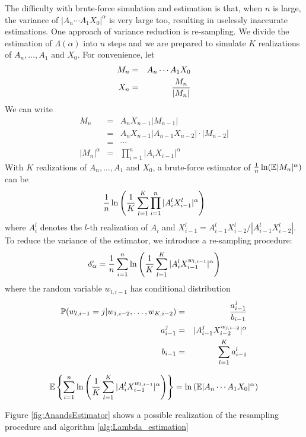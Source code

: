 \documentclass[aoas,preprint]{imsart}
\numberwithin{equation}{section}
\theoremstyle{plain}
\begin{document}
The difficulty with brute-force simulation and estimation is that,
when $n$ is large, the variance of $|A_n \cdots A_1 X_0|^\alpha$
is very large too, resulting in uselessly inaccurate estimations. One
approach of variance reduction is re-sampling. We divide the
estimation of $\Lambda(\alpha)$ into $n$ steps and we are prepared to
simulate $K$ realizations of $A_n, \dots, A_1$ and $X_0$. For
convenience, let
\begin{eqnarray*}
  M_n &=& A_n \cdots A_1 X_0 \\
  X_n &=& {M_n \over |M_n|}
\end{eqnarray*}
We can write
\begin{eqnarray*}
  M_n &=& A_n X_{n - 1} |M_{n - 1}| \\
  &=& A_n X_{n - 1} |A_{n-1} X_{n-2}| \cdot |M_{n-2}| \\
  &=& \cdots \\
  |M_n|^\alpha &=& \prod_{i=1}^n |A_i X_{i-1}|^\alpha
\end{eqnarray*}
With $K$ realizations of $A_n, \dots, A_1$ and $X_0$, a brute-force
estimator of ${1 \over n} \ln(\E |M_n|^\alpha)$ can be
\[
{1 \over n} \ln \left(
  {1 \over K} \sum_{l=1}^K \prod_{i=1}^n |A_i^l X^l_{i-1}|^\alpha
\right)
\]
where $A_i^l$ denotes the $l$-th realization of $A_i$ and
$X^l_{i-1} = A_{i-1}^l X^l_{i-2}/|A_{i-1}^l X^l_{i-2}|$. To reduce the
variance of the estimator, we introduce a re-sampling procedure:
\begin{equation}
  \label{eq:AnandsEstimator}
  \mathscr E_\alpha =
  {1 \over n}
  \sum_{i=1}^n \ln \left(
    {1 \over K}\sum_{l=1}^K |A_i^l X^{w_{l, i-1}}_{i-1}|^\alpha
  \right)
\end{equation}
where the random variable $w_{l, i-1}$ has conditional distribution
\begin{eqnarray*}
  \P(w_{l, i-1} = j | w_{1, i-2}, \dots, w_{K, i-2}) &=& {a^j_{i-1} \over b_{i-1}} \\
  a_{i-1}^j &=& |A_{i-1}^j X_{i-2}^{w_{j, i-2}}|^\alpha \\
  b_{i-1} &=& \sum_{l=1}^K a_{i-1}^l
\end{eqnarray*}
\begin{theorem}
  \[
  \E \left\{
    \sum_{i=1}^n \ln \left(
      {1 \over K}\sum_{l=1}^K |A_i^l X^{w_{l, i-1}}_{i-1}|^\alpha
    \right)
  \right\} = \ln \left(
    \E |A_n \cdots A_1 X_0|^\alpha
  \right)
  \]
\end{theorem}
Figure \ref{fig:AnandsEstimator} shows a possible realization of the
resampling procedure and algorithm \ref{alg:Lambda_estimation}
\end{document}
